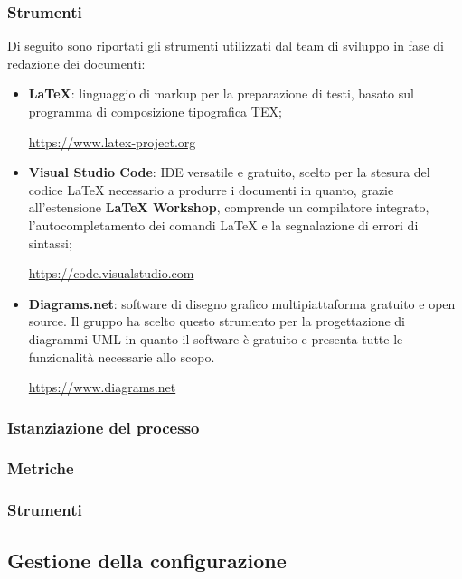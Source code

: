 \subsubsection{Strumenti}
Di seguito sono riportati gli strumenti utilizzati dal team di sviluppo in fase di redazione dei documenti:
\begin{itemize}
    \item \textbf{\LaTeX}: linguaggio di markup per la preparazione di testi, basato sul programma di composizione tipografica TEX;
          \begin{center}\url{https://www.latex-project.org}\end{center}
    \item \textbf{Visual Studio Code}: IDE\glo{} versatile e gratuito, scelto per la stesura del codice \LaTeX\glo{} necessario a produrre i documenti in quanto, grazie all'estensione \textbf{LaTeX Workshop}, comprende un compilatore integrato, l'autocompletamento dei comandi \LaTeX \glo{} e la segnalazione di errori di sintassi;
          \begin{center}\url{https://code.visualstudio.com}\end{center}
    \item \textbf{Diagrams.net}: software di disegno grafico multipiattaforma gratuito e open source\glo{}. Il gruppo ha scelto questo strumento per la progettazione di diagrammi UML\glo{} in quanto il software è gratuito e presenta tutte le funzionalità necessarie allo scopo.
          \begin{center}\url{https://www.diagrams.net}\end{center}
\end{itemize}
\subsubsection{Istanziazione del processo}
\subsubsection{Metriche}
\subsubsection{Strumenti}
\vspace{2cm}

\subsection{Gestione della configurazione}\label{subsection:gestione_configurazione}
